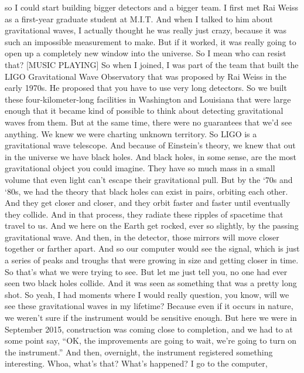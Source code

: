 \begin{itemize}
  so I could start building bigger detectors and a bigger team. I first
  met Rai Weiss as a first-year graduate student at M.I.T. And when I
  talked to him about gravitational waves, I actually thought he was
  really just crazy, because it was such an impossible measurement to
  make. But if it worked, it was really going to open up a completely
  new window into the universe. So I mean who can resist that? {[}MUSIC
  PLAYING{]} So when I joined, I was part of the team that built the
  LIGO Gravitational Wave Observatory that was proposed by Rai Weiss in
  the early 1970s. He proposed that you have to use very long detectors.
  So we built these four-kilometer-long facilities in Washington and
  Louisiana that were large enough that it became kind of possible to
  think about detecting gravitational waves from them. But at the same
  time, there were no guarantees that we'd see anything. We knew we were
  charting unknown territory. So LIGO is a gravitational wave telescope.
  And because of Einstein's theory, we knew that out in the universe we
  have black holes. And black holes, in some sense, are the most
  gravitational object you could imagine. They have so much mass in a
  small volume that even light can't escape their gravitational pull.
  But by the `70s and `80s, we had the theory that black holes can exist
  in pairs, orbiting each other. And they get closer and closer, and
  they orbit faster and faster until eventually they collide. And in
  that process, they radiate these ripples of spacetime that travel to
  us. And we here on the Earth get rocked, ever so slightly, by the
  passing gravitational wave. And then, in the detector, those mirrors
  will move closer together or farther apart. And so our computer would
  see the signal, which is just a series of peaks and troughs that were
  growing in size and getting closer in time. So that's what we were
  trying to see. But let me just tell you, no one had ever seen two
  black holes collide. And it was seen as something that was a pretty
  long shot. So yeah, I had moments where I would really question, you
  know, will we see these gravitational waves in my lifetime? Because
  even if it occurs in nature, we weren't sure if the instrument would
  be sensitive enough. But here we were in September 2015, construction
  was coming close to completion, and we had to at some point say, ``OK,
  the improvements are going to wait, we're going to turn on the
  instrument.'' And then, overnight, the instrument registered something
  interesting. Whoa, what's that? What's happened? I go to the computer,

\end{itemize}
